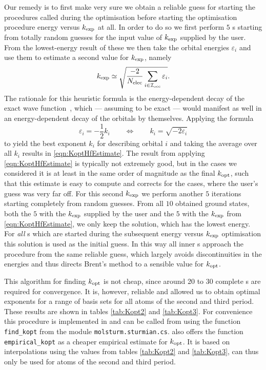 Our remedy is to first make very sure we obtain a reliable
guess for starting the \SCF procedures called during the optimisation
before starting the optimisation procedure energy versus $k_\text{exp}$ at all.
In order to do so
we first perform $5$ {\SCF}s starting from totally random guesses
for the input value of $k_\text{exp}$ supplied by the user.
From the lowest-energy result of these we then
take the orbital energies $\varepsilon_i$
and use them to estimate a second value for $k_\text{exp}$, namely
\begin{equation}
	k_\text{exp} \simeq \sqrt{\frac{-2}{N_\text{elec}} \sum_{i\in\mathcal{I}_\text{occ}} \varepsilon_i}.
	\label{eqn:KoptHfEstimate}
\end{equation}
The rationale for this heuristic formula is
the energy-dependent decay of the exact wave function~\cite{Kato1951},
which --- assuming \HF to be exact --- would manifest as well in an
energy-dependent decay of the orbitals by themselves.
Applying the formula
\[ \varepsilon_i = - \frac12 k_i \qquad \Leftrightarrow \qquad k_i
	= \sqrt{-2 \varepsilon_i}
\]
to yield the best exponent $k_i$ for describing orbital $i$ and taking the average
over all $k_i$ results in \eqref{eqn:KoptHfEstimate}.
The result from applying \eqref{eqn:KoptHfEstimate} is typically not extremely good,
but in the cases we considered it is at least in the same order of magnitude
as the final $k_\text{opt}$,
such that this estimate is easy to compute and corrects for the cases,
where the user's guess was very far off.
For this second $k_\text{exp}$ we perform another $5$ \SCF iterations
starting completely from random guesses.
From all $10$ obtained \SCF ground states,
both the $5$ with the $k_\text{exp}$ supplied by the user and the $5$ with the $k_\text{exp}$
from \eqref{eqn:KoptHfEstimate},
we only keep the solution, which has the lowest \HF energy.
For \emph{all} {\SCF}s which are started during the
subsequent energy versus $k_\text{exp}$ optimisation
this solution is used as the initial guess.
In this way all inner {\SCF}s approach the \SCF procedure
from the same reliable guess,
which largely avoids discontinuities in the \HF energies
and thus directs Brent's method to a sensible value for $k_\text{opt}$.

This algorithm for finding $k_\text{opt}$ is not cheap,
since around 20 to 30 complete {\SCF}s are required for convergence.
It is, however, reliable and allowed us to obtain optimal exponents
for a range of basis sets for all atoms of the second and third period.
These results are shown in tables \vref{tab:Kopt2} and \vref{tab:Kopt3}.
For convenience this procedure is implemented in \molsturm
and can be called from \python using the function
\texttt{find\_kopt} from the module \texttt{molsturm.sturmian.cs}.
\molsturm also offers the function \texttt{empirical\_kopt}
as a cheaper empirical estimate for $k_\text{opt}$.
It is based on interpolations using the values from
tables \ref{tab:Kopt2} and \ref{tab:Kopt3},
can thus only be used for atoms of the second and third period.

